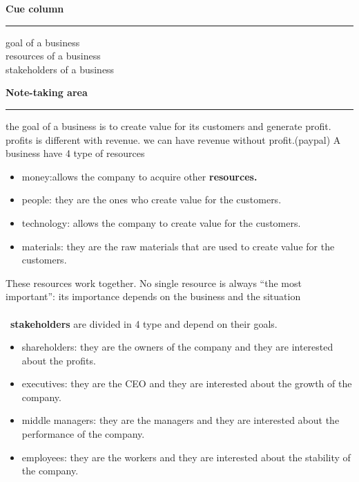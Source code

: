 \documentclass[12pt,a4paper]{report}
\begin{document}
\noindent
\begin{minipage}[t][0.68\textheight][t]{0.27\textwidth}
    \textbf{Cue column}\\[0.5em]
    \rule{\linewidth}{0.4pt}
    goal of a business
    \\
    \newline
    resources of a business
    \newline
    \\
    stakeholders of a business
    \newline
    \\
\end{minipage}%
\hfill
\begin{minipage}[t][0.68\textheight][t]{0.69\textwidth}
    \textbf{Note-taking area}\\[0.5em]
    \rule{\linewidth}{0.4pt}
    the goal of a business is to create value for its customers and generate profit. profits is different with revenue. we can have revenue without profit.(paypal)
    \newline
    A business have 4 type of resources
    \begin{itemize}
        \item money:allows the company to acquire other \textbf{resources.}
        \item people: they are the ones who create value for the customers.
        \item technology: allows the company to create value for the customers.
        \item materials: they are the raw materials that are used to create value for the customers.
    \end{itemize}
    These resources work together. No single resource is always
“the most important”: its importance depends on the business
and the situation
\\\\\
    \textbf{stakeholders }are divided in 4 type and depend on their goals.
    \begin{itemize}
        \item shareholders: they are the owners of the company and they are interested about the profits.   
        \item executives: they are the CEO and they are interested about the growth of the company.
        \item middle managers: they are the managers and they are interested about the performance of the company.
        \item employees: they are the workers and they are interested about the stability of the company.
    \end{itemize} 
\end{minipage}
\end{document}

